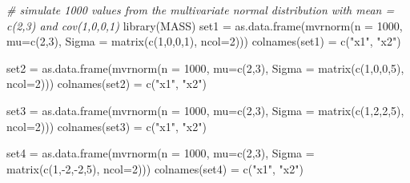 \documentclass[
]{article}
\newenvironment{Shaded}{\begin{snugshade}}{\end{snugshade}}
\newcommand{\AttributeTok}[1]{\textcolor[rgb]{0.77,0.63,0.00}{#1}}
\newcommand{\CommentTok}[1]{\textcolor[rgb]{0.56,0.35,0.01}{\textit{#1}}}
\newcommand{\DecValTok}[1]{\textcolor[rgb]{0.00,0.00,0.81}{#1}}
\newcommand{\FunctionTok}[1]{\textcolor[rgb]{0.00,0.00,0.00}{#1}}
\newcommand{\NormalTok}[1]{#1}
\newcommand{\OtherTok}[1]{\textcolor[rgb]{0.56,0.35,0.01}{#1}}
\newcommand{\SpecialCharTok}[1]{\textcolor[rgb]{0.00,0.00,0.00}{#1}}
\newcommand{\StringTok}[1]{\textcolor[rgb]{0.31,0.60,0.02}{#1}}
\begin{document}
\begin{Shaded}
\begin{Highlighting}[]
\CommentTok{\# simulate 1000 values from the multivariate normal distribution with mean = c(2,3) and cov(1,0,0,1)}
\FunctionTok{library}\NormalTok{(MASS)}
\NormalTok{set1 }\OtherTok{=} \FunctionTok{as.data.frame}\NormalTok{(}\FunctionTok{mvrnorm}\NormalTok{(}\AttributeTok{n =} \DecValTok{1000}\NormalTok{, }\AttributeTok{mu=}\FunctionTok{c}\NormalTok{(}\DecValTok{2}\NormalTok{,}\DecValTok{3}\NormalTok{), }\AttributeTok{Sigma =} \FunctionTok{matrix}\NormalTok{(}\FunctionTok{c}\NormalTok{(}\DecValTok{1}\NormalTok{,}\DecValTok{0}\NormalTok{,}\DecValTok{0}\NormalTok{,}\DecValTok{1}\NormalTok{), }\AttributeTok{ncol=}\DecValTok{2}\NormalTok{)))}
\FunctionTok{colnames}\NormalTok{(set1) }\OtherTok{=} \FunctionTok{c}\NormalTok{(}\StringTok{"x1"}\NormalTok{, }\StringTok{"x2"}\NormalTok{)}

\NormalTok{set2 }\OtherTok{=} \FunctionTok{as.data.frame}\NormalTok{(}\FunctionTok{mvrnorm}\NormalTok{(}\AttributeTok{n =} \DecValTok{1000}\NormalTok{, }\AttributeTok{mu=}\FunctionTok{c}\NormalTok{(}\DecValTok{2}\NormalTok{,}\DecValTok{3}\NormalTok{), }\AttributeTok{Sigma =} \FunctionTok{matrix}\NormalTok{(}\FunctionTok{c}\NormalTok{(}\DecValTok{1}\NormalTok{,}\DecValTok{0}\NormalTok{,}\DecValTok{0}\NormalTok{,}\DecValTok{5}\NormalTok{), }\AttributeTok{ncol=}\DecValTok{2}\NormalTok{)))}
\FunctionTok{colnames}\NormalTok{(set2) }\OtherTok{=} \FunctionTok{c}\NormalTok{(}\StringTok{"x1"}\NormalTok{, }\StringTok{"x2"}\NormalTok{)}

\NormalTok{set3 }\OtherTok{=} \FunctionTok{as.data.frame}\NormalTok{(}\FunctionTok{mvrnorm}\NormalTok{(}\AttributeTok{n =} \DecValTok{1000}\NormalTok{, }\AttributeTok{mu=}\FunctionTok{c}\NormalTok{(}\DecValTok{2}\NormalTok{,}\DecValTok{3}\NormalTok{), }\AttributeTok{Sigma =} \FunctionTok{matrix}\NormalTok{(}\FunctionTok{c}\NormalTok{(}\DecValTok{1}\NormalTok{,}\DecValTok{2}\NormalTok{,}\DecValTok{2}\NormalTok{,}\DecValTok{5}\NormalTok{), }\AttributeTok{ncol=}\DecValTok{2}\NormalTok{)))}
\FunctionTok{colnames}\NormalTok{(set3) }\OtherTok{=} \FunctionTok{c}\NormalTok{(}\StringTok{"x1"}\NormalTok{, }\StringTok{"x2"}\NormalTok{)}

\NormalTok{set4 }\OtherTok{=} \FunctionTok{as.data.frame}\NormalTok{(}\FunctionTok{mvrnorm}\NormalTok{(}\AttributeTok{n =} \DecValTok{1000}\NormalTok{, }\AttributeTok{mu=}\FunctionTok{c}\NormalTok{(}\DecValTok{2}\NormalTok{,}\DecValTok{3}\NormalTok{), }\AttributeTok{Sigma =} \FunctionTok{matrix}\NormalTok{(}\FunctionTok{c}\NormalTok{(}\DecValTok{1}\NormalTok{,}\SpecialCharTok{{-}}\DecValTok{2}\NormalTok{,}\SpecialCharTok{{-}}\DecValTok{2}\NormalTok{,}\DecValTok{5}\NormalTok{), }\AttributeTok{ncol=}\DecValTok{2}\NormalTok{)))}
\FunctionTok{colnames}\NormalTok{(set4) }\OtherTok{=} \FunctionTok{c}\NormalTok{(}\StringTok{"x1"}\NormalTok{, }\StringTok{"x2"}\NormalTok{)}
\end{Highlighting}
\end{Shaded}
\end{document}
